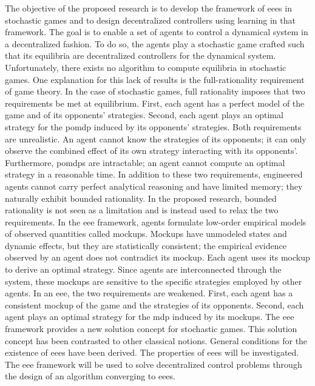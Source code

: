 The objective of the proposed research is to develop the framework of \acp{eee} in stochastic games and to design decentralized controllers using learning in that framework.
The goal is to enable a set of agents to control a dynamical system in a decentralized fashion.
To do so, the agents play a stochastic game crafted such that its equilibria are decentralized controllers for the dynamical system.
Unfortunately, there exists no algorithm to compute equilibria in stochastic games.
One explanation for this lack of results is the full-rationality requirement of game theory.
In the case of stochastic games, full rationality imposes that two requirements be met at equilibrium.
First, each agent has a perfect model of the game and of its opponents' strategies.
Second, each agent plays an optimal strategy for the \ac{pomdp} induced by its opponents' strategies.
Both requirements are unrealistic.
An agent cannot know the strategies of its opponents; it can only observe the combined effect of its own strategy interacting with its opponents'.
Furthermore, \acp{pomdp} are intractable; an agent cannot compute an optimal strategy in a reasonable time.
In addition to these two requirements, engineered agents cannot carry perfect analytical reasoning and have limited memory; they naturally exhibit bounded rationality.
In the proposed research, bounded rationality is not seen as a limitation and is instead used to relax the two requirements.
In the \ac{eee} framework, agents formulate low-order empirical models of observed quantities called mockups.
Mockups have unmodeled states and dynamic effects, but they are statistically consistent; the empirical evidence observed by an agent does not contradict its mockup.
Each agent uses its mockup to derive an optimal strategy.
Since agents are interconnected through the system, these mockups are sensitive to the specific strategies employed by other agents.
In an \ac{eee}, the two requirements are weakened.
First, each agent has a consistent mockup of the game and the strategies of its opponents.
Second, each agent plays an optimal strategy for the \ac{mdp} induced by its mockups.
The \ac{eee} framework provides a new solution concept for stochastic games.
This solution concept has been contrasted to other classical notions.
General conditions for the existence of \acp{eee} have been derived.
The properties of \acp{eee} will be investigated.
The \ac{eee} framework will be used to solve decentralized control problems through the design of an algorithm converging to \acp{eee}.

